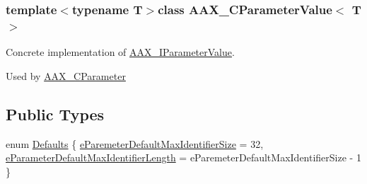 \subsubsection*{template$<$typename T$>$class A\+A\+X\+\_\+\+C\+Parameter\+Value$<$ T $>$}

Concrete implementation of \hyperlink{a00109}{A\+A\+X\+\_\+\+I\+Parameter\+Value}. 

Used by \hyperlink{a00033}{A\+A\+X\+\_\+\+C\+Parameter} \subsection*{Public Types}
\begin{DoxyCompactItemize}
\item 
enum \hyperlink{a00035_a559b1aa8a083ff7ce3251103fc74bf39}{Defaults} \{ \hyperlink{a00035_a559b1aa8a083ff7ce3251103fc74bf39afcb4963e49ff01a53c02c071fda5a0b4}{e\+Paremeter\+Default\+Max\+Identifier\+Size} = 32, 
\hyperlink{a00035_a559b1aa8a083ff7ce3251103fc74bf39a471b7bbe5310d88a7fe073bab18d7d15}{e\+Parameter\+Default\+Max\+Identifier\+Length} = e\+Paremeter\+Default\+Max\+Identifier\+Size -\/ 1
 \}
\end{DoxyCompactItemize}
